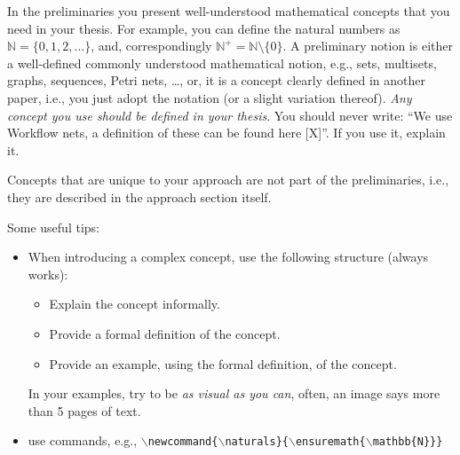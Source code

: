 In the preliminaries you present well-understood mathematical concepts that you need in your thesis.
For example, you can define the natural numbers as $\mathbb{N}{=}\{0,1,2,...\}$, and, correspondingly $\mathbb{N}^+{=}\mathbb{N}{\setminus}\{0\}$.
A preliminary notion is either a well-defined commonly understood mathematical notion, e.g., sets, multisets, graphs, sequences, Petri nets, \dots, or, it is a concept clearly defined in another paper, i.e., you just adopt the notation (or a slight variation thereof).
\emph{Any concept you use should be defined in your thesis}.
You should never write: \enquote{We use Workflow nets, a definition of these can be found here [X]}.
If you use it, explain it.

Concepts that are unique to your approach are not part of the preliminaries, i.e., they are described in the approach section itself.

Some useful tips:
\begin{itemize}
    \item When introducing a complex concept, use the following structure (always works):
    \begin{itemize}
        \item Explain the concept informally.
        \item Provide a formal definition of the concept.
        \item Provide an example, using the formal definition, of the concept.
    \end{itemize}
    In your examples, try to be \emph{as visual as you can}, often, an image says more than 5 pages of text.
    \item use commands, e.g., \texttt{$\backslash$newcommand\{$\backslash$naturals\}\{$\backslash$ensuremath\{$\backslash$mathbb\{N\}\}\}}
\end{itemize}
